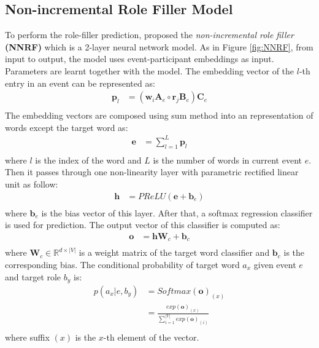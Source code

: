 \documentclass[a4paper]{article}
\begin{document}
\subsection{Non-incremental Role Filler Model} \label{sec:nnrf}
To perform the role-filler prediction, \citet{tilk2016event} proposed the \textit{non-incremental role filler} \textbf{(NNRF)} which is a 2-layer neural network model. As in Figure \ref{fig:NNRF}, from input to output, the model uses event-participant embeddings as input. Parameters are learnt together with the model. The embedding vector of the $l$-th entry in an event can be represented as:
\begin{equation} \label{eq:rbe-nnrf}
\begin{aligned}
    \mathbf{p}_l
        &= (\mathbf{w}_i \mathbf{A}_e \circ \mathbf{r}_j \mathbf{B}_e) \mathbf{C}_e \\
\end{aligned}
\end{equation}
The embedding vectors are composed using sum method into an representation of words except the target word as:
\begin{equation} \label{eq:sum-comp}
\begin{aligned}
    \mathbf{e}
        &= \sum_{l=1}^{L} \mathbf{p}_{l} \\
\end{aligned}
\end{equation}
where $l$ is the index of the word and $L$ is the number of words in current event $e$. Then it passes through one non-linearity layer with parametric rectified linear unit \citep{he2015delving} as follow:
\begin{equation} \label{eq:nonlinearity-nnrf}
\begin{aligned}
    \mathbf{h}
        &= PReLU(\mathbf{e} + \mathbf{b}_e) \\
\end{aligned}
\end{equation}
where $\mathbf{b}_e$ is the bias vector of this layer. After that, a softmax regression classifier is used for prediction. The output vector of this classifier is computed as:
\begin{equation} \label{eq:output-nnrf}
\begin{aligned}
    \mathbf{o}
        &= \mathbf{h}\mathbf{W}_c + \mathbf{b}_c \\
\end{aligned}
\end{equation}
where $\mathbf{W}_c\in \mathbb{R}^{d \times |V|}$ is a weight matrix of the target word classifier and $\mathbf{b}_c$ is the corresponding bias. The conditional probability of target word $a_x$ given event $e$ and target role $b_y$ is:
\begin{equation} \label{eq:softmax-nnrf}
\begin{aligned}
    p(a_x | e, b_y)
        &= Softmax(\mathbf{o})_{(x)} \\
        &= \frac{
        exp(\mathbf{o})_{(x)}
        }{
        \sum_{i=1}^{|V|} exp(\mathbf{o})_{(i)} }   \\
\end{aligned}
\end{equation}
where suffix $(x)$ is the $x$-th element of the vector. 
\end{document}

